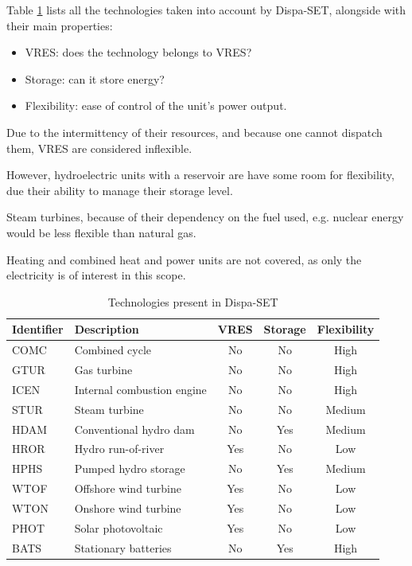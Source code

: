 Table \ref{table:technologies-eu} lists all the technologies taken into account by Dispa-SET, alongside with their main properties: 

\begin{itemize}
    \item VRES: does the technology belongs to VRES?
    \item Storage: can it store energy?
    \item Flexibility: ease of control of the unit's power output.
\end{itemize}

Due to the intermittency of their resources, and because one cannot dispatch them, VRES are considered inflexible.

However, hydroelectric units with a reservoir are have some room for flexibility, due their ability to manage their storage level.

Steam turbines, because of their dependency on the fuel used, e.g. nuclear energy would be less flexible than natural gas.

Heating and combined heat and power units are not covered, as only the electricity is of interest in this scope.

\begin{table}
    \centering
    \begin{tabular}{|l l c c c|}
        \hline
		Identifier & Description & VRES & Storage & Flexibility\\
		\hline
		COMC & Combined cycle             & No  & No  & High\\
		GTUR & Gas turbine                & No  & No  & High\\
		ICEN & Internal combustion engine & No  & No  & High\\
		STUR & Steam turbine              & No  & No  & Medium\\
		HDAM & Conventional hydro dam     & No  & Yes & Medium \\
		HROR & Hydro run-of-river         & Yes & No  & Low\\
		HPHS & Pumped hydro storage       & No  & Yes & Medium\\
		WTOF & Offshore wind turbine      & Yes & No  & Low\\
		WTON & Onshore wind turbine       & Yes & No  & Low\\
		PHOT & Solar photovoltaic         & Yes & No  & Low\\
		BATS & Stationary batteries       & No  & Yes & High\\
		\hline
    \end{tabular}
    \caption{Technologies present in Dispa-SET}
    \label{table:technologies-eu}
\end{table}


